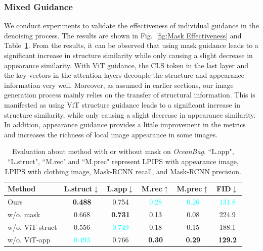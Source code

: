 \subsubsection{Mixed Guidance}
We conduct experiments to validate the effectiveness of individual guidance in the denoising process. The results are shown in Fig.~\ref{fig:Mask Effectiveness} and Table~\ref{mask_table}.
From the results, it can be observed that using mask guidance leads to a significant increase in structure similarity while only causing a slight decrease in appearance similarity. With ViT guidance, the CLS token in the last layer and the key vectors in the attention layers decouple the structure and appearance information very well. Moreover, as assumed in earlier sections, our image generation process mainly relies on the transfer of structural information. This is manifested as using ViT structure guidance leads to a significant increase in structure similarity, while only causing a slight decrease in appearance similarity. In addition, appearance guidance provides a little improvement in the metrics and increases the richness of local image appearance in some images.

\begin{table}[!t]
\begin{center}
\caption{Evaluation about method with or without mask on \textit{OceanBag}. ``L.app", ``L.struct", ``M.rec" and ``M.prec" represent LPIPS with appearance image, LPIPS with clothing image, Mask-RCNN recall, and Mask-RCNN precision.}
\begin{tabular}{l|c c c c c}
     	\toprule
         Method & L.struct$\downarrow$&L.app$\downarrow$ & M.rec$\uparrow$ & M.prec$\uparrow$ &FID$\downarrow$ \\
          \midrule
          Ours &\textbf{0.488}&0.754&\textcolor{cyan}{0.28}&\textcolor{cyan}{0.26}&\textcolor{cyan}{131.8}\\

          w/o. mask &0.668&\textbf{0.731}&0.13&0.08&224.9\\
          w/o. ViT-struct &0.556&\textcolor{cyan}{0.749}&0.18&0.15&188.1\\
          w/o. ViT-app &\textcolor{cyan}{0.493}&0.766&\textbf{0.30}&\textbf{0.29}&\textbf{129.2}\\
          \bottomrule
          
\end{tabular}
\label{mask_table}
\end{center}
\end{table}


